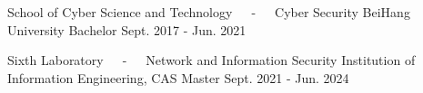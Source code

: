 

\begin{cventries}

  \cventry
    {School of Cyber Science and Technology~~~-~~~Cyber Security} %
    {BeiHang University} %
    {Bachelor} %
    {Sept. 2017 - Jun. 2021} %
    {
    }

  \cventry
    {Sixth Laboratory~~~-~~~Network and Information Security} %
    {Institution of Information Engineering, CAS} %
    {Master} %
    {Sept. 2021 - Jun. 2024} %
    {
    }

\end{cventries}
